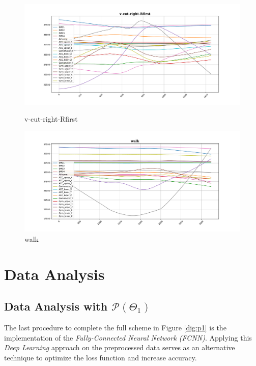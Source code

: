 \begin{figure}[!tbp]
	\begin{minipage}[b]{0.45\textwidth}
		\includegraphics[width=\textwidth]{images/v-cut-right-Rfirst_example.pdf}
		\caption{v-cut-right-Rfirst}
	\end{minipage}
	\begin{minipage}[b]{0.45\textwidth}
		\includegraphics[width=\textwidth]{images/walk_example.pdf}
		\caption{walk}
		\label{sm22}
	\end{minipage}
\end{figure}

\section{Data Analysis}

\subsection{Data Analysis with $\mathcal{P}(\Theta_{1})$}
The last procedure to complete the full scheme in Figure \ref{dig:p1} is the implementation of the
\emph{Fully-Connected Neural Network (FCNN)}. Applying this \emph{Deep Learning} approach on the preprocessed
data serves as an alternative technique to optimize the loss function and increase accuracy.

